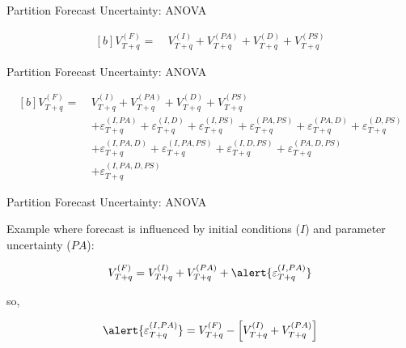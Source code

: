 \documentclass[12pt, compress, aspectratio=1610]{beamer}
\begin{document}
\begin{frame}{%
\protect\hypertarget{partition-forecast-uncertainty-anova}{%
Partition Forecast Uncertainty: ANOVA}}

\begin{equation*}
\begin{aligned}[b]
V_{T+q}^{(F)} = \ &V_{T+q}^{(I)} + V_{T+q}^{(PA)} + V_{T+q}^{(D)} + V_{T+q}^{(PS)}
\end{aligned}
\end{equation*}

\end{frame}

\begin{frame}{%
\protect\hypertarget{partition-forecast-uncertainty-anova-1}{%
Partition Forecast Uncertainty: ANOVA}}

\begin{equation*}
\begin{aligned}[b]
V_{T+q}^{(F)} = \ &V_{T+q}^{(I)} + V_{T+q}^{(PA)} + V_{T+q}^{(D)} + V_{T+q}^{(PS)} \\
&+ \varepsilon_{T+q}^{(I,PA)} + \varepsilon_{T+q}^{(I,D)} + \varepsilon_{T+q}^{(I,PS)} + \varepsilon_{T+q}^{(PA,PS)} + \varepsilon_{T+q}^{(PA,D)} + \varepsilon_{T+q}^{(D,PS)} \\
&+ \varepsilon_{T+q}^{(I,PA,D)} + \varepsilon_{T+q}^{(I,PA,PS)} + \varepsilon_{T+q}^{(I,D,PS)} + \varepsilon_{T+q}^{(PA,D,PS)} \\
&+ \varepsilon_{T+q}^{(I,PA,D,PS)}
\end{aligned}
\end{equation*}

\end{frame}

\begin{frame}{%
\protect\hypertarget{partition-forecast-uncertainty-anova-2}{%
Partition Forecast Uncertainty: ANOVA}}

Example where forecast is influenced by initial conditions (\(I\)) and
parameter uncertainty (\(PA\)):

\begin{equation*}
V^{(F)}_{T+q} = V^{(I)}_{T+q} + V^{(PA)}_{T+q} + \alert{\varepsilon_{T+q}^{(I,PA)}}
\end{equation*}

so,

\begin{equation*}
\alert{\varepsilon_{T+q}^{(I,PA)}} = V^{(F)}_{T+q} - \left[ V^{(I)}_{T+q} + V^{(PA)}_{T+q} \right]
\end{equation*}

\end{frame}
\end{document}
